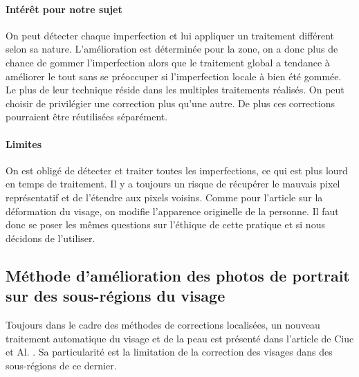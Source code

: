 \documentclass[11pt, french]{report-rd-info}
\begin{document}
\paragraph{Intérêt pour notre sujet}
On peut détecter chaque imperfection et lui appliquer un traitement différent selon sa nature. L’amélioration est déterminée pour la zone, on a donc plus de chance de gommer l’imperfection alors que le traitement global a tendance à améliorer le tout sans se préoccuper si l’imperfection locale à bien été gommée. Le plus de leur technique réside dans les multiples traitements réalisés. On peut choisir de privilégier une correction plus qu’une autre. De plus ces corrections pourraient être réutilisées séparément.

\paragraph{Limites}
On est obligé de détecter et traiter toutes les imperfections, ce qui est plus lourd en temps de traitement. 
Il y a toujours un risque de récupérer le mauvais pixel représentatif et de l’étendre aux pixels voisins. 
Comme pour l’article sur la déformation du visage, on modifie l’apparence originelle de la personne. Il faut donc se poser les mêmes questions sur l’éthique de cette pratique et si nous décidons de l’utiliser. 


\subsection{Méthode d’amélioration des photos de portrait sur des sous-régions du visage}
Toujours dans le cadre des méthodes de corrections localisées, un nouveau traitement automatique du visage et de la peau est présenté dans l’article de Ciuc et Al. \cite{Ciuc2010}. Sa particularité est la limitation de la correction des visages dans des sous-régions de ce dernier.
\end{document}
